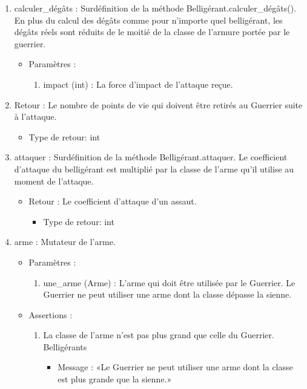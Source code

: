 \documentclass[12pt,pdftex,oneside]{article}
\begin{document}
\begin{itemize}
    \begin{enumerate}
    \item calculer\_dégâts : Surdéfinition de la méthode
      Belligérant.calculer\_dégâts(). En plus du calcul des dégâts comme pour
      n'importe quel belligérant, les dégâts réels sont réduits de le moitié de
      la classe de l'armure portée par le guerrier.
      \begin{itemize}
      \item Paramètres : 
        \begin{enumerate}
        \item impact (int) : La force d'impact de l'attaque reçue.
        \end{enumerate}
      \end{itemize}
      \item Retour : Le nombre de points de vie qui doivent être retirés au
        Guerrier suite à l'attaque.
          \begin{itemize}
          \item Type de retour: int
          \end{itemize}

    \item attaquer : Surdéfinition de la méthode Belligérant.attaquer. Le
      coefficient d'attaque du belligérant est multiplié par la classe de l'arme
      qu'il utilise au moment de l'attaque.
      \begin{itemize}
      \item Retour : Le coefficient d'attaque d'un assaut.
          \begin{itemize}
          \item Type de retour: int
          \end{itemize}
      \end{itemize}

    \item arme : Mutateur de l'arme.
      \begin{itemize}
      \item Paramètres : 
        \begin{enumerate}
        \item une\_arme (Arme) : L'arme qui doit être utilisée par le
          Guerrier. Le Guerrier ne peut utiliser une arme dont la classe dépasse
          la sienne.
        \end{enumerate}
      \item Assertions : 
        \begin{enumerate}
            \item La classe de l'arme n'est pas plus grand que celle du Guerrier.
            Belligérants
            \begin{itemize}
              \item Message : «Le Guerrier ne peut utiliser une arme dont la
                classe est plus grande que la sienne.»
            \end{itemize}
        \end{enumerate}


\end{itemize}
\end{enumerate}
\end{itemize}
\end{document}
